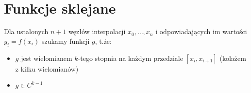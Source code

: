 \section{Funkcje sklejane}
Dla ustalonych \( n + 1 \) węzłów interpolacji \( x_0, \dots, x_n \) i odpowiadających im wartości  \( y_i = f(x_i) \) szukamy funkcji \( g \), t.że:
\begin{itemize}
\onehalfspacing
    \item \( g \) jest wielomianem \( k \)-tego stopnia na każdym przedziale \( [x_i, x_{i+1}] \) (kolażem z kilku wielomianów)
    \item \( g \in C^{k-1} \)
\end{itemize}